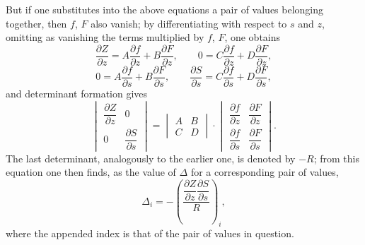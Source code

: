 \documentclass[10pt]{article}
\begin{document}
But if one substitutes into the above equations a pair of values belonging together, then $f$, $F$ also vanish; by differentiating with respect to $s$ and $z$, omitting as vanishing the terms multiplied by $f$, $F$, one obtains
\[
\frac{\partial Z}{\partial z}=A\frac{\partial f}{\partial z}+B\frac{\partial F}{\partial z},\qquad
0=C\frac{\partial f}{\partial z}+D\frac{\partial F}{\partial z},
\]
\[
0=A\frac{\partial f}{\partial s}+B\frac{\partial F}{\partial s},\qquad
\frac{\partial S}{\partial s}=C\frac{\partial f}{\partial s}+D\frac{\partial F}{\partial s},
\]
and determinant formation gives
\[
\begin{vmatrix}
\dfrac{\partial Z}{\partial z}&0\\[0.2em]
0&\dfrac{\partial S}{\partial s}
\end{vmatrix}
=
\begin{vmatrix}A&B\\C&D\end{vmatrix}
\cdot
\begin{vmatrix}
\dfrac{\partial f}{\partial z}&\dfrac{\partial F}{\partial z}\\[0.2em]
\dfrac{\partial f}{\partial s}&\dfrac{\partial F}{\partial s}
\end{vmatrix}.
\]
The last determinant, analogously to the earlier one, is denoted by $-R$; from this equation one then finds, as the value of $\Delta$ for a corresponding pair of values,
\[
\Delta_i=-\left(\frac{\dfrac{\partial Z}{\partial z}\dfrac{\partial S}{\partial s}}{R}\right)_i,
\]
where the appended index is that of the pair of values in question.
\end{document}
